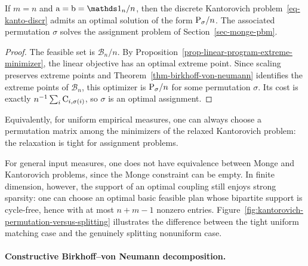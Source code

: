 \begin{cor}\label{cor-kantorovich-matching}
	If $m=n$ and $\a=\b=\ones_n/n$, then the discrete Kantorovich problem~\eqref{eq-kanto-discr} admits an optimal solution of the form $\P_\sigma/n$. The associated permutation $\sigma$ solves the assignment problem of Section~\ref{sec-monge-pbm}.
\end{cor}
\begin{proof}
	The feasible set is $\mathcal B_n/n$. By Proposition~\ref{prop-linear-program-extreme-minimizer}, the linear objective has an optimal extreme point. Since scaling preserves extreme points and Theorem~\ref{thm-birkhoff-von-neumann} identifies the extreme points of $\mathcal B_n$, this optimizer is $\P_\sigma/n$ for some permutation $\sigma$. Its cost is exactly $n^{-1}\sum_i \C_{i,\sigma(i)}$, so $\sigma$ is an optimal assignment.
\end{proof}

Equivalently, for uniform empirical measures, one can always choose a permutation matrix among the minimizers of the relaxed Kantorovich problem: the relaxation is tight for assignment problems.

\begin{rem}
	For general input measures, one does not have equivalence between Monge and Kantorovich problems, since the Monge constraint can be empty. In finite dimension, however, the support of an optimal coupling still enjoys strong sparsity: one can choose an optimal basic feasible plan whose bipartite support is cycle-free, hence with at most $n+m-1$ nonzero entries. Figure~\ref{fig:kantorovich-permutation-versus-splitting} illustrates the difference between the tight uniform matching case and the genuinely splitting nonuniform case.
\end{rem}

\paragraph{Constructive Birkhoff--von Neumann decomposition.}

